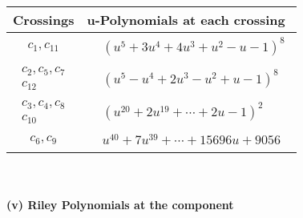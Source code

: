 \documentclass[1p]{elsarticle_modified}
\theoremstyle{definition}
\begin{document}
\begin{tabular}{m{50pt}|m{274pt}}
Crossings & \hspace{64pt}u-Polynomials at each crossing \\
\hline $$\begin{aligned}c_{1},c_{11}\end{aligned}$$&$\begin{aligned}
&(u^5+3 u^4+4 u^3+u^2- u-1)^8
\end{aligned}$\\
\hline $$\begin{aligned}c_{2},c_{5},c_{7}\\c_{12}\end{aligned}$$&$\begin{aligned}
&(u^5- u^4+2 u^3- u^2+u-1)^8
\end{aligned}$\\
\hline $$\begin{aligned}c_{3},c_{4},c_{8}\\c_{10}\end{aligned}$$&$\begin{aligned}
&(u^{20}+2 u^{19}+\cdots+2 u-1)^{2}
\end{aligned}$\\
\hline $$\begin{aligned}c_{6},c_{9}\end{aligned}$$&$\begin{aligned}
&u^{40}+7 u^{39}+\cdots+15696 u+9056
\end{aligned}$\\
\hline
\end{tabular}\\~\\
\newpage\renewcommand{\arraystretch}{1}
\flushleft \textbf{(v) Riley Polynomials at the component}\newline \\
\end{document}
